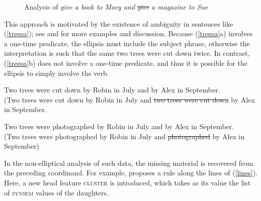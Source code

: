 \begin{figure}
    \centering

    \caption{Analysis of \emph{give a book to Mary and} \sout{\emph{give}} \emph{a magazine to Sue}}\label{lpe}
\end{figure}

This approach is motivated by the existence of ambiguity in 
sentences like (\ref{treesa}); see  \citet{Beavers} and \citet{chaves06} for more examples and discussion. Because (\ref{treesa}a) involves a one-time predicate, the ellipsis must include the subject phrase, otherwise
the interpretation is such that the same two trees were cut down twice. In contrast,  (\ref{treesa}b) does not involve a one-time
predicate, and thus it is possible for the ellipsis to simply
involve the verb.


\eal
\label{treesa}
\ex Two trees were cut down by Robin in July and by Alex in September.\\
(Two trees were cut down by Robin in July and \sout{two trees were cut down} by Alex in September.

\ex Two trees were photographed by Robin in July and by Alex in September.\\
(Two trees were photographed by Robin in July and \sout{photographed} by Alex in September)
\zl



In the non-elliptical analysis of such data, the missing material is recovered from the preceding
coordinand. For example, \citet[]{Mouret:06} proposes a rule along the lines of
(\ref{lines}).  Here, a new head feature \textsc{cluster} is introduced, which takes as its value
the list of \textsc{synsem} values of the daughters.

